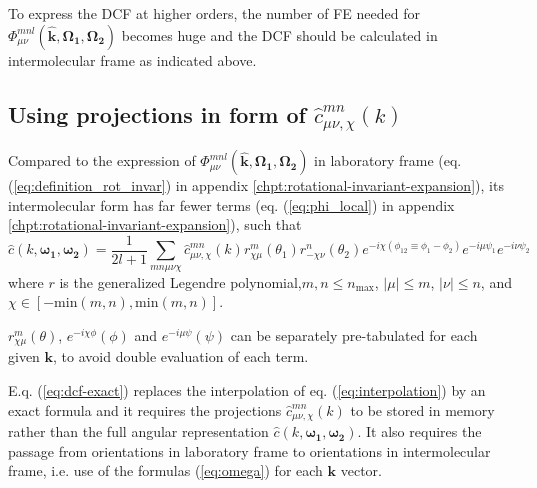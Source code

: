 To express the DCF at higher orders, the number of FE needed for $\Phi_{\mu\nu}^{mnl}(\mathbf{\hat{k}},\mathbf{\Omega_{1}},\mathbf{\Omega_{2}})$
becomes huge and the DCF should be calculated in intermolecular frame
as indicated above.

\subsection{Using projections in form of $\hat{c}_{\mu\nu,\chi}^{mn}(k)$\label{subsec:Using-projections-in-1}}

Compared to the expression of $\Phi_{\mu\nu}^{mnl}(\mathbf{\hat{k}},\mathbf{\Omega_{1}},\mathbf{\Omega_{2}})$
in laboratory frame (eq. (\ref{eq:definition_rot_invar}) in appendix
\ref{chpt:rotational-invariant-expansion}), its intermolecular form
has far fewer terms (eq. (\ref{eq:phi_local}) in appendix \ref{chpt:rotational-invariant-expansion}),
such that
\begin{equation}
\hat{c}(k,\boldsymbol{\omega_{1}},\boldsymbol{\omega_{2}})=\frac{1}{2l+1}\sum_{mn\mu\nu\chi}\hat{c}_{\mu\nu,\chi}^{mn}(k)r_{\chi\mu}^{m}(\theta_{1})r_{-\chi\nu}^{n}(\theta_{2})e^{-i\chi(\phi_{12}\equiv\phi_{1}-\phi_{2})}e^{-i\mu\psi_{1}}e^{-i\nu\psi_{2}}\label{eq:dcf-exact}
\end{equation}
where $r$ is the generalized Legendre polynomial,$m,n\leq n{}_{\mathrm{max}}$,
$\left|\mu\right|\leq m$, $\left|\nu\right|\leq n$, and $\chi\in\left[-\mathrm{min}(m,n),\mathrm{min}(m,n)\right]$.

$r_{\chi\mu}^{m}(\theta)$, $e^{-i\chi\phi}(\phi)$ and $e^{-i\mu\psi}(\psi)$
can be separately pre-tabulated for each given $\mathbf{k}$, to avoid
double evaluation of each term.

E.q. (\ref{eq:dcf-exact}) replaces the interpolation of eq. (\ref{eq:interpolation})
by an exact formula and it requires the projections $\hat{c}_{\mu\nu,\chi}^{mn}(k)$
to be stored in memory rather than the full angular representation
$\hat{c}(k,\boldsymbol{\omega_{1}},\boldsymbol{\omega_{2}})$. It
also requires the passage from orientations in laboratory frame to
orientations in intermolecular frame, i.e. use of the formulas (\ref{eq:omega})
for each $\mathbf{k}$ vector.
